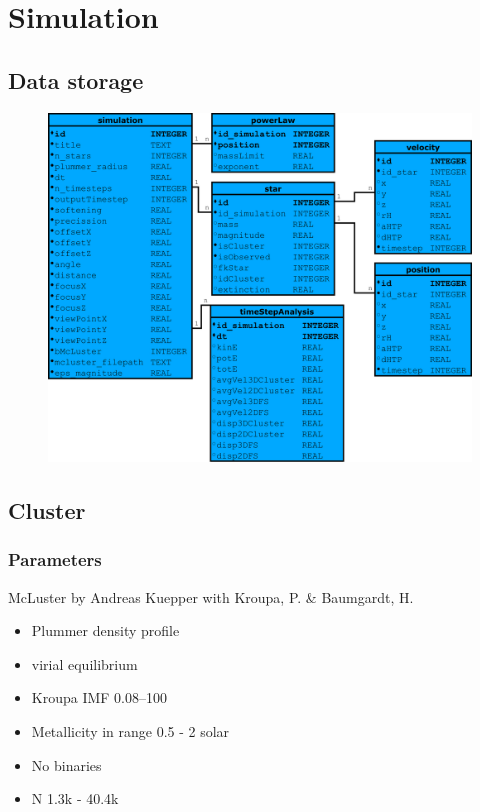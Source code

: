 \documentclass{beamer}
\begin{document}
\section{Simulation}

\subsection{Data storage}

\begin{frame}
\begin{figure}
\centering
\includegraphics[width=\textwidth,height=0.8\textheight,keepaspectratio]{Images/ERD.pdf}
\end{figure}
\end{frame}


\subsection{Cluster}

\begin{frame}
\frametitle{Parameters}
McLuster by Andreas Kuepper with Kroupa, P. \& Baumgardt, H.
\\[2ex]
\begin{itemize}
\item Plummer density profile
\item virial equilibrium
\item Kroupa IMF \SIrange{0.08}{100}{\solarmass}
\item Metallicity  in range 0.5 - 2 solar
\item No binaries
\item N 1.3k - 40.4k
\end{itemize}

\end{frame}
\end{document}
